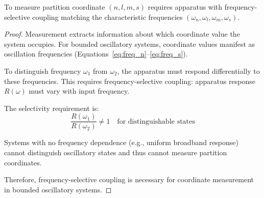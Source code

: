 \begin{theorem}
\label{thm:instrument_necessity}
To measure partition coordinate $(n, l, m, s)$ requires apparatus with frequency-selective coupling matching the characteristic frequencies $(\omega_n, \omega_l, \omega_m, \omega_s)$.
\end{theorem}

\begin{proof}
Measurement extracts information about which coordinate value the system occupies. For bounded oscillatory systems, coordinate values manifest as oscillation frequencies (Equations~\ref{eq:freq_n}--\ref{eq:freq_s}).

To distinguish frequency $\omega_1$ from $\omega_2$, the apparatus must respond differentially to these frequencies. This requires frequency-selective coupling: apparatus response $R(\omega)$ must vary with input frequency.

The selectivity requirement is:
\begin{equation}
\frac{R(\omega_1)}{R(\omega_2)} \neq 1 \quad \text{for distinguishable states}
\end{equation}

Systems with no frequency dependence (e.g., uniform broadband response) cannot distinguish oscillatory states and thus cannot measure partition coordinates.

Therefore, frequency-selective coupling is necessary for coordinate measurement in bounded oscillatory systems.
\end{proof}

